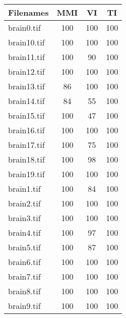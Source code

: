 \begin{tabular}{lccc}
\hline
 Filenames             & MMI & VI  & TI  \\ \hline \hline
 brain0.tif  & 100 & 100 & 100 \\
 brain10.tif & 100 & 100 & 100 \\
 brain11.tif & 100 & 90  & 100 \\
 brain12.tif & 100 & 100 & 100 \\
 brain13.tif & 86  & 100 & 100 \\
 brain14.tif & 84  & 55  & 100 \\
 brain15.tif & 100 & 47  & 100 \\
 brain16.tif & 100 & 100 & 100 \\
 brain17.tif & 100 & 75  & 100 \\
 brain18.tif & 100 & 98  & 100 \\
 brain19.tif & 100 & 100 & 100 \\
 brain1.tif  & 100 & 84  & 100 \\
 brain2.tif  & 100 & 100 & 100 \\
 brain3.tif  & 100 & 100 & 100 \\
 brain4.tif  & 100 & 97  & 100 \\
 brain5.tif  & 100 & 87  & 100 \\
 brain6.tif  & 100 & 100 & 100 \\
 brain7.tif  & 100 & 100 & 100 \\
 brain8.tif  & 100 & 100 & 100 \\
 brain9.tif  & 100 & 100 & 100 \\
\hline
\end{tabular}
